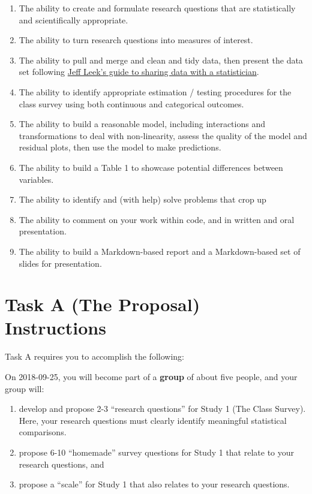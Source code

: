 \documentclass[]{book}
\providecommand{\tightlist}{%
  \setlength{\itemsep}{0pt}\setlength{\parskip}{0pt}}
\theoremstyle{definition}
\theoremstyle{definition}
\theoremstyle{definition}
\theoremstyle{remark}
\begin{document}
\begin{enumerate}
\def\labelenumi{\arabic{enumi}.}
\tightlist
\item
  The ability to create and formulate research questions that are
  statistically and scientifically appropriate.
\item
  The ability to turn research questions into measures of interest.
\item
  The ability to pull and merge and clean and tidy data, then present
  the data set following
  \href{https://github.com/jtleek/datasharing}{Jeff Leek's guide to
  sharing data with a statistician}.
\item
  The ability to identify appropriate estimation / testing procedures
  for the class survey using both continuous and categorical outcomes.
\item
  The ability to build a reasonable model, including interactions and
  transformations to deal with non-linearity, assess the quality of the
  model and residual plots, then use the model to make predictions.
\item
  The ability to build a Table 1 to showcase potential differences
  between variables.
\item
  The ability to identify and (with help) solve problems that crop up
\item
  The ability to comment on your work within code, and in written and
  oral presentation.
\item
  The ability to build a Markdown-based report and a Markdown-based set
  of slides for presentation.
\end{enumerate}

\hypertarget{taskA}{%
\chapter{Task A (The Proposal) Instructions}\label{taskA}}

Task A requires you to accomplish the following:

On 2018-09-25, you will become part of a \textbf{group} of about five
people, and your group will:

\begin{enumerate}
\def\labelenumi{\arabic{enumi}.}
\tightlist
\item
  develop and propose 2-3 ``research questions'' for Study 1 (The Class
  Survey). Here, your research questions must clearly identify
  meaningful statistical comparisons.
\item
  propose 6-10 ``homemade'' survey questions for Study 1 that relate to
  your research questions, and
\item
  propose a ``scale'' for Study 1 that also relates to your research
  questions.
\end{enumerate}
\end{document}

